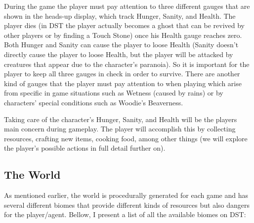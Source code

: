 During the game the player must pay attention to three different gauges that are shown in the heads-up display, which track Hunger, Sanity, and Health.
The player dies (in DST the player actually becomes a ghost that can be revived by other players or by finding a Touch Stone) once his Health gauge reaches zero.
Both Hunger and Sanity can cause the player to loose Health (Sanity doesn’t directly cause the player to loose Health, but the player will be attacked by creatures that appear due to the character’s paranoia).
So it is important for the player to keep all three gauges in check in order to survive.
There are another kind of gauges that the player must pay attention to when playing which arise from specific in game situations such as Wetness (caused by rains) or by characters’ special conditions such as Woodie’s Beaverness.

Taking care of the character’s Hunger, Sanity, and Health will be the players main concern during gameplay.
The player will accomplish this by collecting resources, crafting new items, cooking food, among other things (we will explore the player’s possible actions in full detail further on).

\subsection*{The World}
As mentioned earlier, the world is procedurally generated for each game and has several different biomes that provide different kinds of resources but also dangers for the player/agent.
Bellow, I present a list of all the available biomes on DST:


